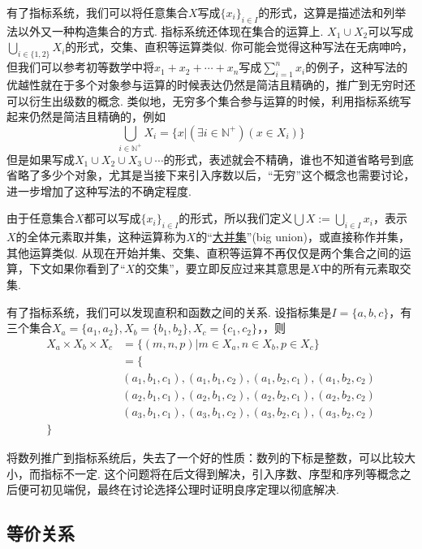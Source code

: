 有了指标系统，我们可以将任意集合\(X\)写成\(\{x_i\}_{i \in I}\)的形式，这算是描述法和列举法以外又一种构造集合的方式. 指标系统还体现在集合的运算上. \(X_1 \cup X_2\)可以写成\(\displaystyle{\bigcup_{i \in \{1,2\}}X_i}\)的形式，交集、直积等运算类似. 你可能会觉得这种写法在无病呻吟，但我们可以参考初等数学中将\(x_1+x_2+\cdots+x_n\)写成\(\displaystyle{\sum_{i = 1}^{n}x_i}\)的例子，这种写法的优越性就在于多个对象参与运算的时候表达仍然是简洁且精确的，推广到无穷时还可以衍生出级数的概念. 类似地，无穷多个集合参与运算的时候，利用指标系统写起来仍然是简洁且精确的，例如
\[\bigcup_{i \in \mathbb{N^+}} X_i =\{x | (\exists i \in \mathbb{N^+})(x \in X_i)\} \]
但是如果写成\(X_1 \cup X_2 \cup X_3 \cup \cdots\)的形式，表述就会不精确，谁也不知道省略号到底省略了多少个对象，尤其是当接下来引入序数以后，“无穷”这个概念也需要讨论，进一步增加了这种写法的不确定程度.

由于任意集合\(X\)都可以写成\(\{x_i\}_{i \in I}\)的形式，所以我们定义\(\displaystyle{\bigcup X := \bigcup_{i \in I}x_i}\)，表示\(X\)的全体元素取并集，这种运算称为\(X\)的“\underline{大并集}”(big union)，或直接称作并集，其他运算类似. 从现在开始并集、交集、直积等运算不再仅仅是两个集合之间的运算，下文如果你看到了“\(X\)的交集”，要立即反应过来其意思是\(X\)中的所有元素取交集.

有了指标系统，我们可以发现直积和函数之间的关系. 设指标集是\(I = \{a,b,c\}\)，有三个集合\(X_a = \{a_1, a_2\}, X_b=\{b_1, b_2\}, X_c = \{c_1, c_2\}\)，，则
\begin{align*}
    X_a \times X_b \times X_c &= \{(m,n,p) | m \in X_a, n \in X_b, p \in X_c\} \\
    &= \{ \\
        &(a_1,b_1,c_1), (a_1, b_1, c_2), (a_1, b_2, c_1), (a_1, b_2, c_2) \\
        &(a_2,b_1,c_1), (a_2, b_1, c_2), (a_2, b_2, c_1), (a_2, b_2, c_2) \\
        &(a_3,b_1,c_1), (a_3, b_1, c_2), (a_3, b_2, c_1), (a_3, b_2, c_2) \\
    \}
\end{align*}

将数列推广到指标系统后，失去了一个好的性质：数列的下标是整数，可以比较大小，而指标不一定. 这个问题将在后文得到解决，引入序数、序型和序列等概念之后便可初见端倪，最终在讨论选择公理时证明良序定理以彻底解决.

\subsection{等价关系}

